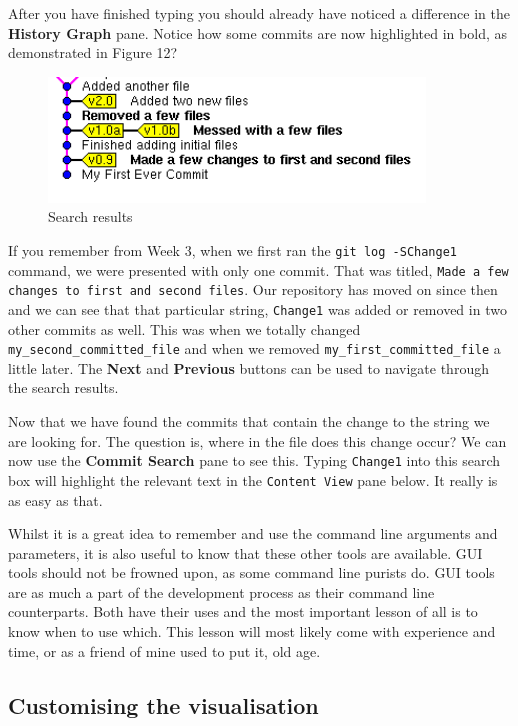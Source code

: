 After you have finished typing you should already have noticed a difference in the \textbf{History Graph} pane.  Notice how some commits are now highlighted in bold, as demonstrated in Figure 12?

\begin{figure}[hbt]
\centering
\includegraphics[width=10cm]{images/f-w5-d12.png}
\caption{Search results}
\end{figure} 

If you remember from Week 3, when we first ran the \texttt{git log -SChange1} command, we were presented with only one commit.  That was titled, \texttt{Made a few changes to first and second files}.  Our repository has moved on since then and we can see that that particular string, \texttt{Change1} was added or removed in two other commits as well.  This was when we totally changed \texttt{my\_second\_committed\_file} and when we removed \texttt{my\_first\_committed\_file} a little later.  The \textbf{Next} and \textbf{Previous} buttons can be used to navigate through the search results.

Now that we have found the commits that contain the change to the string we are looking for.  The question is, where in the file does this change occur?  We can now use the \textbf{Commit Search} pane to see this.  Typing \texttt{Change1} into this search box will highlight the relevant text in the \texttt{Content View} pane below.  It really is as easy as that.

Whilst it is a great idea to remember and use the command line arguments and parameters, it is also useful to know that these other tools are available.  GUI tools should not be frowned upon, as some command line purists do.  GUI tools are as much a part of the development process as their command line counterparts.  Both have their uses and the most important lesson of all is to know when to use which.  This lesson will most likely come with experience and time, or as a friend of mine used to put it, old age.

\subsection{Customising the visualisation}

